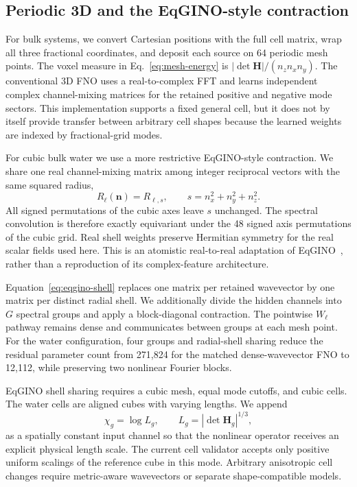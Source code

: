 \documentclass[11pt]{article}
\begin{document}
\subsection{Periodic 3D and the EqGINO-style contraction}

For bulk systems, we convert Cartesian positions with the full cell matrix,
wrap all three fractional coordinates, and deposit each source on 64 periodic
mesh points. The voxel measure in Eq.~\eqref{eq:mesh-energy} is
\(|\det\mathbf H|/(n_zn_xn_y)\). The conventional 3D FNO uses a real-to-complex
FFT and learns independent complex channel-mixing matrices for the retained
positive and negative mode sectors. This implementation supports a fixed
general cell, but it does not by itself provide transfer between arbitrary
cell shapes because the learned weights are indexed by fractional-grid modes.

For cubic bulk water we use a more restrictive EqGINO-style contraction. We
share one real channel-mixing matrix among integer reciprocal vectors with the
same squared radius,
\begin{equation}
 R_\ell(\mathbf n)=R_{\ell,s},\qquad
 s=n_x^2+n_y^2+n_z^2.
 \label{eq:eqgino-shell}
\end{equation}
All signed permutations of the cubic axes leave \(s\) unchanged. The spectral
convolution is therefore exactly equivariant under the 48 signed axis
permutations of the cubic grid. Real shell weights preserve Hermitian symmetry
for the real scalar fields used here. This is an atomistic real-to-real
adaptation of EqGINO~\citep{kim2026eqgino}, rather than a reproduction of its
complex-feature architecture.

Equation~\eqref{eq:eqgino-shell} replaces one matrix per retained wavevector by
one matrix per distinct radial shell. We additionally divide the hidden
channels into \(G\) spectral groups and apply a block-diagonal contraction.
The pointwise \(W_\ell\) pathway remains dense and communicates between groups
at each mesh point. For the water configuration, four groups and radial-shell
sharing reduce the residual parameter count from 271,824 for the matched
dense-wavevector FNO to 12,112, while preserving two nonlinear Fourier blocks.

EqGINO shell sharing requires a cubic mesh, equal mode cutoffs, and cubic
cells. The water cells are aligned cubes with varying lengths. We append
\begin{equation}
 \chi_g=\log L_g,\qquad
 L_g=|\det\mathbf H_g|^{1/3},
 \label{eq:cell-conditioning}
\end{equation}
as a spatially constant input channel so that the nonlinear operator receives
an explicit physical length scale. The current cell validator accepts only
positive uniform scalings of the reference cube in this mode. Arbitrary
anisotropic cell changes require metric-aware wavevectors or separate
shape-compatible models.
\end{document}
